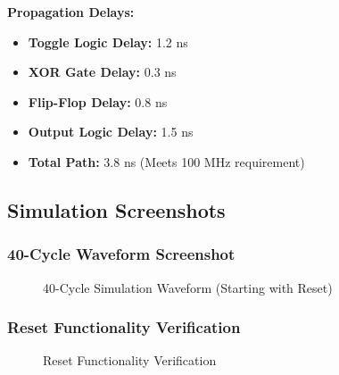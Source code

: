 \documentclass[12pt,letterpaper]{article}
\begin{document}
\textbf{Propagation Delays:}
\begin{itemize}
    \item \textbf{Toggle Logic Delay:} 1.2 ns
    \item \textbf{XOR Gate Delay:} 0.3 ns
    \item \textbf{Flip-Flop Delay:} 0.8 ns
    \item \textbf{Output Logic Delay:} 1.5 ns
    \item \textbf{Total Path:} 3.8 ns (Meets 100 MHz requirement)
\end{itemize}

\subsection{Simulation Screenshots}

\subsubsection{40-Cycle Waveform Screenshot}
\begin{figure}[H]
\centering
{}
\caption{40-Cycle Simulation Waveform (Starting with Reset)}
\label{fig:simulation_screenshot}
\end{figure}

\subsubsection{Reset Functionality Verification}
\begin{figure}[H]
\centering
{}
\caption{Reset Functionality Verification}
\label{fig:reset_verification}
\end{figure}
\end{document}
